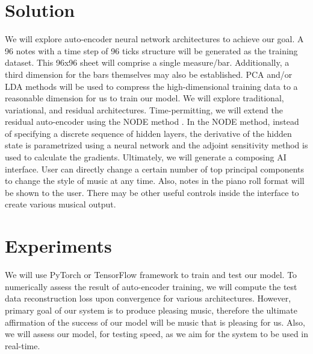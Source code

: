 \documentclass[conference]{IEEEtran}
\begin{document}
\section{Solution}
We will explore auto-encoder neural network architectures to achieve our goal.
A 96 notes with a time step of 96 ticks structure will be generated as the training dataset. This 96x96 sheet will comprise a single measure/bar. Additionally, a third dimension for the bars themselves may also be established. PCA and/or LDA methods will be used to compress the high-dimensional training data to a reasonable dimension for us to train our model. We will explore traditional, variational, and residual architectures. Time-permitting, we will extend the residual auto-encoder using the NODE method \cite{NODE}. In the NODE method, instead of specifying a discrete sequence of hidden layers,  the derivative of the hidden state is parametrized using a neural network and the adjoint sensitivity method is used to calculate the gradients. Ultimately, we will generate a composing AI interface. User can directly change a certain number of top principal components to change the style of music at any time. Also, notes in the piano roll format will be shown to the user. There may be other useful controls inside the interface to create various musical output.

\section{Experiments}
We will use PyTorch \cite{pytorch} or TensorFlow \cite{tensorflow} framework to train and test our model. To numerically assess the result of auto-encoder training, we will compute the test data reconstruction loss upon convergence for various architectures. However, primary goal of our system is to produce pleasing music, therefore the ultimate affirmation of the success of our model will be music that is pleasing for us. Also, we will assess our model, for testing speed, as we aim for the system to be used in real-time.



\end{document}
